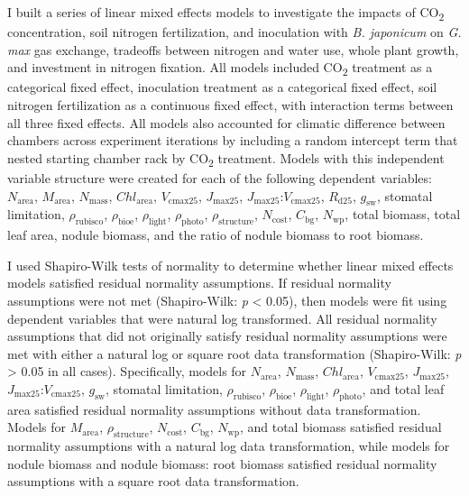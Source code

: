 I built a series of linear mixed effects models to investigate the impacts of CO\textsubscript{2} concentration, soil nitrogen fertilization, and inoculation with \textit{B. japonicum} on \textit{G. max} gas exchange, tradeoffs between nitrogen and water use, whole plant growth, and investment in nitrogen fixation. All models included CO\textsubscript{2} treatment as a categorical fixed effect, inoculation treatment as a categorical fixed effect, soil nitrogen fertilization as a continuous fixed effect, with interaction terms between all three fixed effects. All models also accounted for climatic difference between chambers across experiment iterations by including a random intercept term that nested starting chamber rack by CO\textsubscript{2} treatment. Models with this independent variable structure were created for each of the following dependent variables: $N_\mathrm{area}$, $M_\mathrm{area}$, $N_\mathrm{mass}$, $Chl_\mathrm{area}$, $V_\mathrm{cmax25}$, $J_\mathrm{max25}$, $J_\mathrm{max25}$:$V_\mathrm{cmax25}$, $R_\mathrm{d25}$, $g_\mathrm{sw}$, stomatal limitation, $\rho_\mathrm{rubisco}$, $\rho_\mathrm{bioe}$, $\rho_\mathrm{light}$, $\rho_\mathrm{photo}$, $\rho_\mathrm{structure}$, $N_\mathrm{cost}$, $C_\mathrm{bg}$, $N_\mathrm{wp}$, total biomass, total leaf area, nodule biomass, and the ratio of nodule biomass to root biomass.

I used Shapiro-Wilk tests of normality to determine whether linear mixed effects models satisfied residual normality assumptions. If residual normality assumptions were not met (Shapiro-Wilk: \textit{p} < 0.05), then models were fit using dependent variables that were natural log transformed. All residual normality assumptions that did not originally satisfy residual normality assumptions were met with either a natural log or square root data transformation (Shapiro-Wilk: \textit{p} > 0.05 in all cases). Specifically, models for $N_\mathrm{area}$, $N_\mathrm{mass}$, $Chl_\mathrm{area}$, $V_\mathrm{cmax25}$, $J_\mathrm{max25}$, $J_\mathrm{max25}$:$V_\mathrm{cmax25}$, $g_\mathrm{sw}$, stomatal limitation, $\rho_\mathrm{rubisco}$, $\rho_\mathrm{bioe}$, $\rho_\mathrm{light}$, $\rho_\mathrm{photo}$, and total leaf area satisfied residual normality assumptions without data transformation. Models for $M_\mathrm{area}$, $\rho_\mathrm{structure}$, $N_\mathrm{cost}$, $C_\mathrm{bg}$, $N_\mathrm{wp}$, and total biomass satisfied residual normality assumptions with a natural log data transformation, while models for nodule biomass and nodule biomass: root biomass satisfied residual normality assumptions with a square root data transformation.

